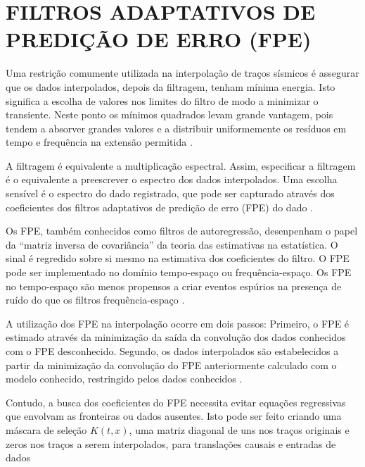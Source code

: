 %
% 
% 
% 
% 
% 
% 

\chapter{FILTROS ADAPTATIVOS DE PREDIÇÃO DE ERRO (FPE)}
\label{cap4:pef}

Uma restrição comumente utilizada na interpolação de traços sísmicos
é assegurar que os dados interpolados, depois da filtragem,
tenham mínima energia. Isto significa a escolha de valores
nos limites do filtro de modo a minimizar o transiente. Neste ponto os mínimos
quadrados levam grande vantagem, pois tendem a absorver grandes valores e a distribuir
uniformemente os resíduos em tempo e frequência na extensão permitida \cite{claerbout92}.

A filtragem é equivalente a multiplicação espectral. Assim, especificar a filtragem
é o equivalente a preescrever o espectro dos dados interpolados. Uma escolha sensível
é o espectro do dado registrado, que pode ser capturado através dos coeficientes dos
filtros adaptativos de predição de erro (FPE) do dado \cite{spitz}. 

Os FPE, também conhecidos como filtros de autoregressão, desenpenham o
papel da ``matriz inversa de covariância'' da teoria das estimativas na estatística.
O sinal é regredido sobre si mesmo na estimativa dos coeficientes do filtro. O FPE
pode ser implementado no domínio tempo-espaço ou frequência-espaço. Os FPE no tempo-espaço
são menos propensos a criar eventos espúrios na presença de ruído do que os filtros
frequência-espaço \cite{abma}. 

A utilização dos FPE na interpolação ocorre em dois passos:
Primeiro, o FPE é estimado através da minimização da saída da convolução
dos dados conhecidos com o FPE desconhecido. Segundo, os dados interpolados
são estabelecidos a partir da minimização da convolução do FPE anteriormente 
calculado com o modelo conhecido, restringido pelos dados conhecidos \cite{curry}.

Contudo, a busca dos coeficientes do FPE necessita evitar equações regressivas que 
envolvam as fronteiras ou dados ausentes. Isto pode ser feito
criando uma máscara de seleção $K(t,x)$, uma matriz 
diagonal de uns nos traços originais e zeros nos traços a serem interpolados, 
para translações causais e entradas de dados \cite{claerbout10}

